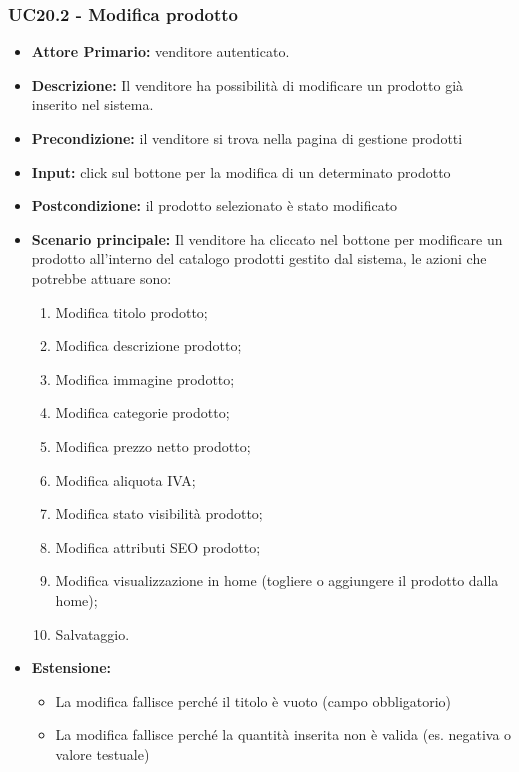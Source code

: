 \subsubsection{UC20.2 - Modifica  prodotto}
\label{UC20.2}
\begin{itemize}
    \item \textbf{Attore Primario:}  venditore autenticato.
    \item \textbf{Descrizione:} Il venditore ha possibilità di modificare un prodotto già inserito nel sistema.
    \item \textbf{Precondizione:} il venditore si trova nella pagina di gestione prodotti
    \item \textbf{Input:} click sul bottone per la modifica di un determinato prodotto
    \item \textbf{Postcondizione:} il prodotto selezionato è stato modificato
    \item \textbf{Scenario principale:} Il venditore ha cliccato nel bottone per modificare un prodotto all’interno del catalogo prodotti gestito dal sistema, le azioni che potrebbe attuare sono: 
    \begin{enumerate}
        \item Modifica titolo prodotto;
        \item Modifica descrizione prodotto;
        \item Modifica immagine prodotto;
        \item Modifica categorie prodotto;
        \item Modifica prezzo netto prodotto;
        \item Modifica aliquota IVA;
        \item Modifica stato visibilità prodotto; 
        \item Modifica attributi SEO prodotto;
        \item Modifica visualizzazione in home (togliere o aggiungere il prodotto dalla home);
        \item Salvataggio.
    \end{enumerate}
    \item \textbf{Estensione:}
    \begin{itemize}
        \item La modifica fallisce perché il titolo è vuoto (campo obbligatorio) 
        \item La modifica fallisce perché la quantità inserita non è valida (es. negativa o valore testuale)
    \end{itemize}
\end{itemize}


